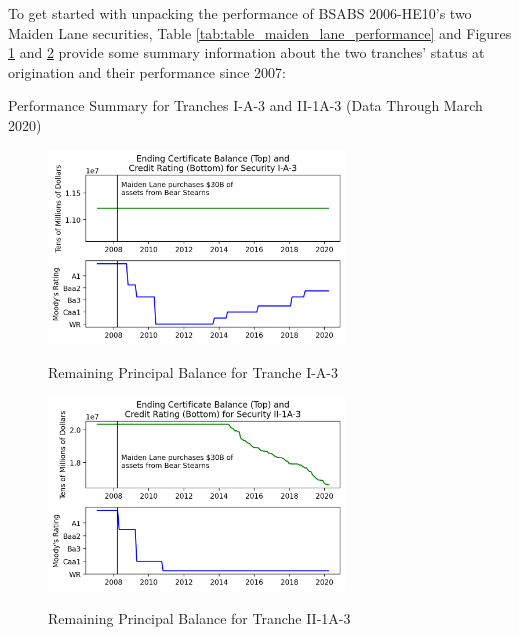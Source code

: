 \documentclass[12pt]{article}
\begin{document}
	To get started with unpacking the performance of BSABS 2006-HE10’s two Maiden Lane securities, Table \ref{tab:table_maiden_lane_performance} and Figures \ref{fig:timeseries_maiden_lane_ia3} and \ref{fig:timeseries_maiden_lane_ii1a3} provide some summary information about the two tranches’ status at origination and their performance since 2007:

\begin{table}[h]
	\centering
	
	\caption{Performance Summary for Tranches I-A-3 and II-1A-3 (Data Through March 2020)}
	\label{tab:table_maiden_lane_performance}
\end{table}

\begin{figure}[h]
	\centering
	\caption{Remaining Principal Balance for Tranche I-A-3}
	\includegraphics[width=0.7\textwidth]{../figures/timeseries_maiden_lane_ia3}
	\label{fig:timeseries_maiden_lane_ia3}
\end{figure}

\begin{figure}[h]
	\centering
	\caption{Remaining Principal Balance for Tranche II-1A-3}
	\includegraphics[width=0.7\textwidth]{../figures/timeseries_maiden_lane_ii1a3}
	\label{fig:timeseries_maiden_lane_ii1a3}
\end{figure}
\end{document}
